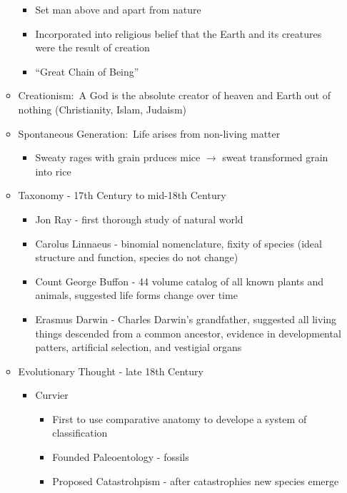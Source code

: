 \documentclass[12pt]{article}
\begin{document}
\begin{itemize}
\begin{itemize}
\begin{itemize}
                \item Set man above and apart from nature
                \item Incorporated into religious belief that the Earth and its creatures were the result of creation
                \item ``Great Chain of Being''
            \end{itemize}
            \item Creationism:\ A God is the absolute creator of heaven and Earth out of nothing (Christianity, Islam, Judaism)
            \item Spontaneous Generation:\ Life arises from non-living matter
            \begin{itemize}
                \item Sweaty rages with grain prduces mice $\rightarrow$ sweat transformed grain into rice
            \end{itemize}
            \item Taxonomy - 17th Century to mid-18th Century
            \begin{itemize}
                \item Jon Ray - first thorough study of natural world
                \item Carolus Linnaeus - binomial nomenclature, fixity of species (ideal structure and function, species do not change)
                \item Count George Buffon - 44 volume catalog of all known plants and animals, suggested life forms change over time
                \item Erasmus Darwin - Charles Darwin's grandfather, suggested all living things descended from a common ancestor, evidence in developmental patters, artificial selection, and vestigial organs
            \end{itemize}
            \item Evolutionary Thought - late 18th Century
            \begin{itemize}
                \item Curvier 
                \begin{itemize}
                    \item First to use comparative anatomy to develope a system of classification
                    \item Founded Paleoentology - fossils
                    \item Proposed Catastrohpism - after catastrophies new species emerge
                \end{itemize}

\end{itemize}
\end{itemize}
\end{itemize}
\end{document}
